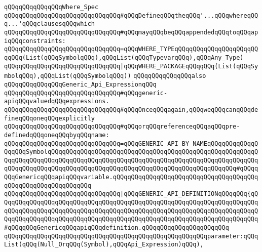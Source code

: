 \verb|qQQqqQQqqQQqqQQqWhere_Spec|\newline
\newline
\verb|qQQqqQQqqQQqqQQqqQQqqQQqqQQqqQQq#qQQqDefineqQQqtheqQQq'...qQQqwhereqQQq...'qQQqclausesqQQqwhich|\newline
\verb|qQQqqQQqqQQqqQQqqQQqqQQqqQQqqQQq#qQQqmayqQQqbeqQQqappendedqQQqtoqQQqapiqQQqconstraints:|\newline
\newline
\verb|qQQqqQQqqQQqqQQqqQQqqQQqqQQqqQQq=qQQqWHERE_TYPEqQQqqQQqqQQqqQQqqQQqqQQqqQQq(List(qQQqSymbolqQQq),qQQqList(qQQqTypevarqQQq),qQQqAny_Type)|\newline
\verb|qQQqqQQqqQQqqQQqqQQqqQQqqQQqqQQq|\verb#|qQQqWHERE_PACKAGEqQQqqQQq(List(qQQqSymbolqQQq),qQQqList(qQQqSymbolqQQq))#\newline
\newline
\newline
\newline
\verb|qQQqqQQqqQQqqQQqalso|\newline
\verb|qQQqqQQqqQQqqQQqGeneric_Api_ExpressionqQQq|\newline
\newline
\verb|qQQqqQQqqQQqqQQqqQQqqQQqqQQqqQQq#qQQqgeneric-apiqQQqvaluedqQQqexpressions.|\newline
\verb|qQQqqQQqqQQqqQQqqQQqqQQqqQQqqQQq#qQQqOnceqQQqagain,qQQqweqQQqcanqQQqdefineqQQqoneqQQqexplicitly|\newline
\verb|qQQqqQQqqQQqqQQqqQQqqQQqqQQqqQQq#qQQqorqQQqreferenceqQQqaqQQqpre-definedqQQqoneqQQqbyqQQqname:|\newline
\newline
\verb|qQQqqQQqqQQqqQQqqQQqqQQqqQQqqQQq=qQQqGENERIC_API_BY_NAMEqQQqqQQqqQQqqQQqqQQqSymbolqQQqqQQqqQQqqQQqqQQqqQQqqQQqqQQqqQQqqQQqqQQqqQQqqQQqqQQqqQQqqQQqqQQqqQQqqQQqqQQqqQQqqQQqqQQqqQQqqQQqqQQqqQQqqQQqqQQqqQQqqQQqqQQqqQQqqQQqqQQqqQQqqQQqqQQqqQQqqQQqqQQqqQQqqQQqqQQqqQQqqQQqqQQqqQQq#qQQqqQQqGenericqQQqapiqQQqvariable.qQQqqQQqqQQqqQQqqQQqqQQqqQQqqQQqqQQqqQQqqQQqqQQqqQQqqQQqqQQqqQQq|\newline
\verb|qQQqqQQqqQQqqQQqqQQqqQQqqQQqqQQq|\verb#|qQQqGENERIC_API_DEFINITIONqQQqqQQq{qQQqqQQqqQQqqQQqqQQqqQQqqQQqqQQqqQQqqQQqqQQqqQQqqQQqqQQqqQQqqQQqqQQqqQQqqQQqqQQqqQQqqQQqqQQqqQQqqQQqqQQqqQQqqQQqqQQqqQQqqQQqqQQqqQQqqQQqqQQqqQQqqQQqqQQqqQQqqQQqqQQqqQQqqQQqqQQqqQQqqQQqqQQqqQQqqQQqqQQqqQQqqQQqqQQq#\verb|#qQQqqQQqGenericqQQqapiqQQqdefinition.qQQqqQQqqQQqqQQqqQQqqQQq|\newline
\verb|qQQqqQQqqQQqqQQqqQQqqQQqqQQqqQQqqQQqqQQqqQQqqQQqqQQqqQQqparameter:qQQqList(qQQq(Null_OrqQQq(Symbol),qQQqApi_Expression)qQQq),|\newline
